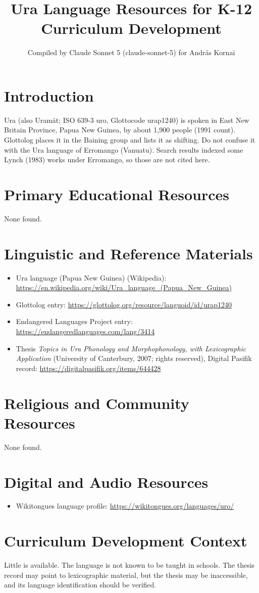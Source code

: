 \documentclass[12pt]{article}
\title{Ura Language Resources for K-12 Curriculum Development}
\author{Compiled by Claude Sonnet 5 (claude-sonnet-5) for Andr\'as Kornai}
\date{}
\begin{document}
\maketitle
\section{Introduction}
Ura (also Uram\"at; ISO 639-3 uro, Glottocode urap1240) is spoken in East New Britain Province, Papua New Guinea, by about 1,900 people (1991 count). Glottolog places it in the Baining group and lists it as shifting. Do not confuse it with the Ura language of Erromango (Vanuatu). Search results indexed some Lynch (1983) works under Erromango, so those are not cited here.
\section{Primary Educational Resources}
None found.
\section{Linguistic and Reference Materials}
\begin{itemize}
\item Ura language (Papua New Guinea) (Wikipedia): \url{https://en.wikipedia.org/wiki/Ura_language_(Papua_New_Guinea)}
\item Glottolog entry: \url{https://glottolog.org/resource/languoid/id/urap1240}
\item Endangered Languages Project entry: \url{https://endangeredlanguages.com/lang/3414}
\item Thesis \emph{Topics in Ura Phonology and Morphophonology, with Lexicographic Application} (University of Canterbury, 2007; rights reserved), Digital Pasifik record: \url{https://digitalpasifik.org/items/644428}
\end{itemize}
\section{Religious and Community Resources}
None found.
\section{Digital and Audio Resources}
\begin{itemize}
\item Wikitongues language profile: \url{https://wikitongues.org/languages/uro/}
\end{itemize}
\section{Curriculum Development Context}
Little is available. The language is not known to be taught in schools. The thesis record may point to lexicographic material, but the thesis may be inaccessible, and its language identification should be verified.
\end{document}
